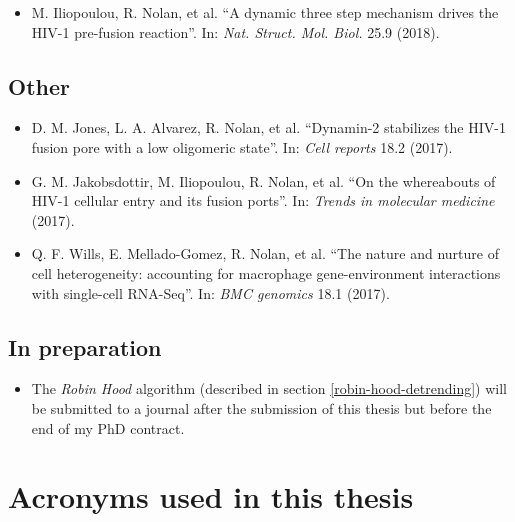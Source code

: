 \documentclass[12pt,]{book}
\providecommand{\tightlist}{%
  \setlength{\itemsep}{0pt}\setlength{\parskip}{0pt}}
\theoremstyle{definition}
\theoremstyle{definition}
\theoremstyle{definition}
\theoremstyle{remark}
\begin{document}
\begin{itemize}
\tightlist
\item
  M. Iliopoulou, R. Nolan, et al. ``A dynamic three step mechanism
  drives the HIV-1 pre-fusion reaction''. In: \emph{Nat. Struct. Mol.
  Biol.} 25.9 (2018).
\end{itemize}

\subsection*{Other}\label{other}

\begin{itemize}
\tightlist
\item
  D. M. Jones, L. A. Alvarez, R. Nolan, et al. ``Dynamin-2 stabilizes
  the HIV-1 fusion pore with a low oligomeric state''. In: \emph{Cell
  reports} 18.2 (2017).
\item
  G. M. Jakobsdottir, M. Iliopoulou, R. Nolan, et al. ``On the
  whereabouts of HIV-1 cellular entry and its fusion ports''. In:
  \emph{Trends in molecular medicine} (2017).
\item
  Q. F. Wills, E. Mellado-Gomez, R. Nolan, et al. ``The nature and
  nurture of cell heterogeneity: accounting for macrophage
  gene-environment interactions with single-cell RNA-Seq''. In:
  \emph{BMC genomics} 18.1 (2017).
\end{itemize}

\subsection*{In preparation}\label{in-preparation}

\begin{itemize}
\tightlist
\item
  The \emph{Robin Hood} algorithm (described in section
  \ref{robin-hood-detrending}) will be submitted to a journal after the
  submission of this thesis but before the end of my PhD contract.
\end{itemize}

\section*{Acronyms used in this
thesis}\label{acronyms-used-in-this-thesis}
\end{document}
